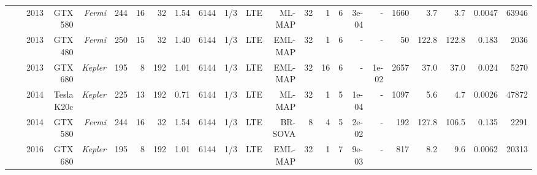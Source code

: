 \begin{table}[htp]
{{\begin{tabular}{|r|r r|r r r r r r|r r r|r r r r|r r r r|r r r|}
                                                                 & \cite{Chen2013}      & 2013          & GTX 580            & \textit{Fermi}     & 244          & 16             & 32            & 1.54           & 6144     & 1/3      & LTE             &  ML-MAP            & 32            & 1              & 6        & 3e-04        &     -          &                 1660  &                   3.7  &   3.7          & 0.0047        &  63946             \\
                                                                 & \cite{Xianjun2013}   & 2013          & GTX 480            & \textit{Fermi}     & 250          & 15             & 32            & 1.40           & 6144     & 1/3      & LTE             & EML-MAP            & 32            & 1              & 6        &     -        &     -          & {\color{Paired-3} 50} &                 122.8  & 122.8          & 0.183         &   2036             \\
                                                                 & \cite{Wu2013}        & 2013          & GTX 680            & \textit{Kepler}    & 195          & 8              & 192           & 1.01           & 6144     & 1/3      & LTE             & EML-MAP            & 32            & 16             & 6        &     -        & 1e-02          &                 2657  &                  37.0  &  37.0          & 0.024         &   5270             \\
                                                                 & \cite{Zhang2014}     & 2014          & Tesla K20c         & \textit{Kepler}    & 225          & 13             & 192           & 0.71           & 6144     & 1/3      & LTE             &  ML-MAP            & 32            & 1              & 5        & 1e-04        &     -          &                 1097  &                   5.6  &   4.7          & 0.0026        &  47872             \\
                                                                 & \cite{Li2014}        & 2014          & GTX 580            & \textit{Fermi}     & 244          & 16             & 32            & 1.54           & 6144     & 1/3      & LTE             & BR-SOVA            & 8             & 4              & 5        & 2e-02        &     -          & {\color{Paired-3}192} &                 127.8  & 106.5          & 0.135         &   2291             \\
                                                                 & \cite{Li2016a}       & 2016          & GTX 680            & \textit{Kepler}    & 195          & 8              & 192           & 1.01           & 6144     & 1/3      & LTE             & EML-MAP            & 32            & 1              & 7        & 9e-03        &     -          &                  817  & {\color{Paired-7} 8.2} &   9.6          & 0.0062        &  20313             \\

\end{tabular}}}
\end{table}
